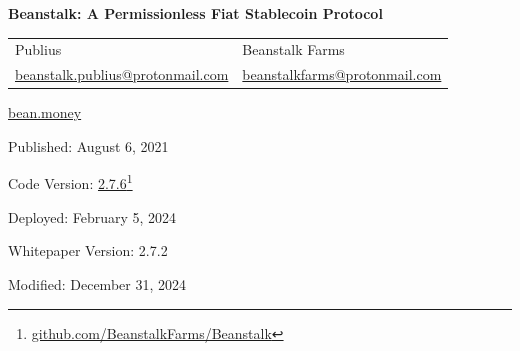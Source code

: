 \documentclass[tikz]{article}
\newcommand{\BeanCover}{} %
\begin{document}
\thispagestyle{empty} %
\begin{titlepage}
    \begin{center}
        \vspace*{-0.1cm}
        \begin{changemargin}{-0.25cm}{-0.25cm}
            \centering %
            \textbf{\Large{Beanstalk: A Permissionless Fiat Stablecoin Protocol}}
        \end{changemargin}
        
        \begin{center}
            \BeanCover
        \end{center}
        
        \vspace{0.4cm}
        \begin{center}
            \begin{tabular}{>{\centering\arraybackslash}p{6cm} >{\centering\arraybackslash}p{6cm}}
                \large{Publius} & \large{Beanstalk Farms} \\
                \href{mailto:beanstalk.publius@protonmail.com}{\normalsize{beanstalk.publius@protonmail.com}} & \href{mailto:beanstalkfarms@protonmail.com}{\normalsize{beanstalkfarms@protonmail.com}}
            \end{tabular}
        \end{center}
        
        \vspace{0.1cm}
        \normalsize{\href{https://bean.money/}{bean.money}}
        
        \vspace{0.4cm}
        \footnotesize{Published:} {\normalsize{August 6, 2021}}
        
        \vspace{-0.25cm}
        \footnotesize{Code Version:} \href{https://github.com/BeanstalkFarms/Beanstalk}{\normalsize{2.7.6}}\footnote{\href{https://github.com/BeanstalkFarms/Beanstalk}{github.com/BeanstalkFarms/Beanstalk}}

        \vspace{-0.25cm}
        \footnotesize{Deployed:} {\normalsize{February 5, 2024}}

        \vspace{-0.25cm}
        \footnotesize{Whitepaper Version:} {\normalsize{2.7.2}}
        
        \vspace{-0.25cm}
        \footnotesize{Modified:} {\normalsize{December 31, 2024}}
        

\end{center}
\end{titlepage}
\end{document}
